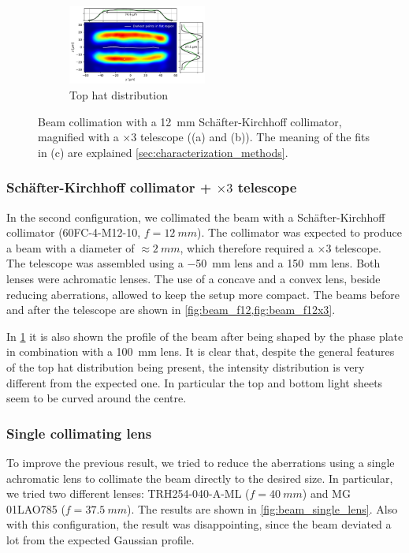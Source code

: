 \begin{figure}[p]
\begin{subfigure}{0.5\textwidth}
    \end{subfigure}
    \\
    \hfill
    \begin{subfigure}{\textwidth}
        \centering
        \includegraphics[width=0.5\textwidth]{chapters/chapter_3/figures/tophat_f12x3.pdf}
        \caption{Top hat distribution}
        \label{fig:tophat_f12x3}
    \end{subfigure}
    \hfill
    \caption{Beam collimation with a \SI{12}{mm} Schäfter-Kirchhoff collimator, magnified with a $\times3$ telescope ((a) and (b)).  The meaning of the fits in (c) are explained \cref{sec:characterization_methods}.}
    \label{fig:f12mm}
\end{figure}

\subsubsection{Schäfter-Kirchhoff collimator + $\times 3$ telescope}
In the second configuration, we collimated the beam with a Schäfter-Kirchhoff collimator (60FC-4-M12-10, $f=\SI{12}{mm}$). The collimator was expected to produce a beam with a diameter of $\approx \SI{2}{mm}$, which therefore required a $\times3$ telescope. The telescope was assembled using a \SI{-50}{mm} lens and a \SI{150}{mm} lens. Both lenses were achromatic lenses. The use of a concave and a convex lens, beside reducing aberrations, allowed to keep the setup more compact. The beams before and after the telescope are shown in \cref{fig:beam_f12,fig:beam_f12x3}.

In \cref{fig:tophat_f12x3} it is also shown the profile of the beam after being shaped by the phase plate in combination with a \SI{100}{mm} lens. It is clear that, despite the general features of the top hat distribution being present, the intensity distribution is very different from the expected one. In particular the top and bottom light sheets seem to be curved around the centre.

\subsubsection{Single collimating lens}
To improve the previous result, we tried to reduce the aberrations using a single achromatic lens to collimate the beam directly to the desired size. In particular, we tried two different lenses: TRH254-040-A-ML ($f=\SI{40}{mm}$) and MG 01LAO785 ($f=\SI{37.5}{mm}$). The results are shown in \cref{fig:beam_single_lens}. Also with this configuration, the result was disappointing, since the beam deviated a lot from the expected Gaussian profile.

